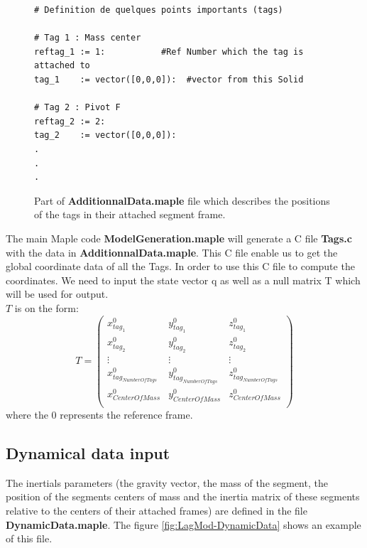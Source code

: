\begin{figure}[!h]
\begin{minipage}[t]{.6\linewidth}
\begin{center}
\begin{tiny}
\begin{verbatim}
# Definition de quelques points importants (tags)

# Tag 1 : Mass center
reftag_1 := 1:           #Ref Number which the tag is attached to
tag_1    := vector([0,0,0]):  #vector from this Solid

# Tag 2 : Pivot F
reftag_2 := 2:
tag_2    := vector([0,0,0]):
.
.
.

\end{verbatim}
\end{tiny}
\end{center}
\end{minipage}
\caption{Part of \textbf{AdditionnalData.maple} file which describes the
  positions of the tags in their attached segment frame.}
\label{fig:LagMod-AdditionnalData}
\end{figure}


The main Maple code \textbf{ModelGeneration.maple} will generate a C file \textbf{Tags.c} with the data in \textbf{AdditionnalData.maple}.
This C file enable us to get the global coordinate data of all the Tags. In order to use this C file to compute the coordinates. We need to input the state vector q as well as a null matrix T which will be used for output. \\

$T$ is on the form:
$$
T = 
\left(
\begin{array}{ccc}
x_{tag_1}^{0} & y_{tag_1}^{0} & z_{tag_1}^{0} \\
x_{tag_2}^{0} & y_{tag_2}^{0} & z_{tag_2}^{0} \\
\vdots & \vdots & \vdots \\
x_{tag_{NumberOfTags}}^{0} & y_{tag_{NumberOfTags}}^{0} &
z_{tag_{NumberOfTags}}^{0} \\
x_{CenterOfMass}^{0} & y_{CenterOfMass}^{0} & z_{CenterOfMass}^{0} \\
\end{array}
\right)
$$
where the $0$ represents the reference frame. 

\subsection{Dynamical data input}
The inertials parameters (the gravity vector, the mass of the segment, the position of
the segments centers of mass and the inertia matrix of these segments
relative to the centers of their attached frames) are defined in the file \textbf{DynamicData.maple}. The
figure \ref{fig:LagMod-DynamicData} shows an example of this file. 

